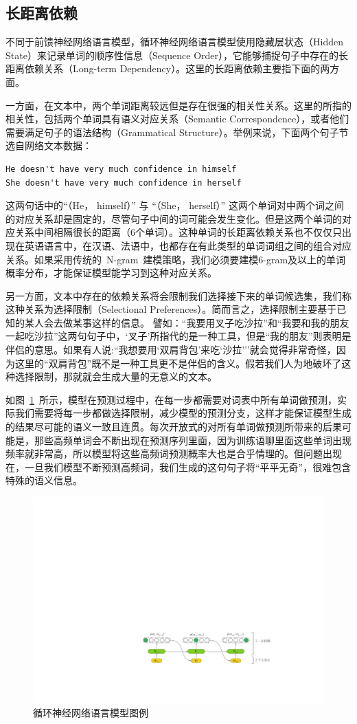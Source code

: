 \subsection{长距离依赖}
不同于前馈神经网络语言模型，循环神经网络语言模型使用隐藏层状态（Hidden State）来记录单词的顺序性信息（Sequence Order），它能够捕捉句子中存在的长距离依赖关系（Long-term Dependency）。这里的长距离依赖主要指下面的两方面。

一方面，在文本中，两个单词距离较远但是存在很强的相关性关系。这里的所指的相关性，包括两个单词具有语义对应关系（Semantic Correspondence），或者他们需要满足句子的语法结构（Grammatical Structure）。举例来说，下面两个句子节选自网络文本数据：
\begin{verbatim}
He doesn't have very much confidence in himself
She doesn't have very much confidence in herself
\end{verbatim}
这两句话中的``（He， himself）'' 与 ``（She， herself）'' 这两个单词对中两个词之间的对应关系却是固定的，尽管句子中间的词可能会发生变化。但是这两个单词的对应关系中间相隔很长的距离（6个单词）。这种单词的长距离依赖关系也不仅仅只出现在英语语言中，在汉语、法语中，也都存在有此类型的单词词组之间的组合对应关系。如果采用传统的~N-gram~建模策略，我们必须要建模6-gram及以上的单词概率分布，才能保证模型能学习到这种对应关系。

另一方面，文本中存在的依赖关系将会限制我们选择接下来的单词候选集，我们称这种关系为选择限制（Selectional Preferences）。简而言之，选择限制主要基于已知的某人会去做某事这样的信息。
譬如：``我要用叉子吃沙拉''和``我要和我的朋友一起吃沙拉''这两句句子中，`叉子'所指代的是一种工具，但是``我的朋友''则表明是伴侣的意思。如果有人说:``我想要用`双肩背包'来吃`沙拉'''就会觉得非常奇怪，因为这里的``双肩背包''既不是一种工具更不是伴侣的含义。假若我们人为地破坏了这种选择限制，那就就会生成大量的无意义的文本。

如图~\ref{fig:lm}~所示，模型在预测过程中，在每一步都需要对词表中所有单词做预测，实际我们需要将每一步都做选择限制，减少模型的预测分支，这样才能保证模型生成的结果尽可能的语义一致且连贯。每次开放式的对所有单词做预测所带来的后果可能是，那些高频单词会不断出现在预测序列里面，因为训练语聊里面这些单词出现频率就非常高，所以模型将这些高频词预测概率大也是合乎情理的。但问题出现在，一旦我们模型不断预测高频词，我们生成的这句句子将``平平无奇''，很难包含特殊的语义信息。

\begin{figure}[!t]
  \centering
  \includegraphics[width=.8\columnwidth]{./figures/lm.pdf}
  \caption{循环神经网络语言模型图例}
  \label{fig:lm}
\end{figure}

